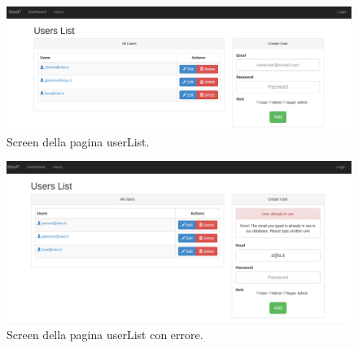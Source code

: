 \begin{figure}[h]
	\centering \includegraphics[width=1\textwidth]{userList.png}
	\caption{Screen della pagina userList.}
\end{figure}

\begin{figure}[h]
	\centering \includegraphics[width=1\textwidth]{userListError.png}
	\caption{Screen della pagina userList con errore. }
\end{figure}